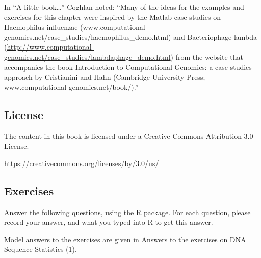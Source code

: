 \documentclass[
]{book}
\begin{document}
In ``A little book\ldots{}'' Coghlan noted: ``Many of the ideas for the examples and exercises for this chapter were inspired by the Matlab case studies on Haemophilus influenzae (www.computational-genomics.net/case\_studies/haemophilus\_demo.html) and Bacteriophage lambda (\url{http://www.computational-genomics.net/case_studies/lambdaphage_demo.html}) from the website that accompanies the book Introduction to Computational Genomics: a case studies approach by Cristianini and Hahn (Cambridge University Press; www.computational-genomics.net/book/).''

\hypertarget{license}{%
\subsection{License}\label{license}}

The content in this book is licensed under a Creative Commons Attribution 3.0 License.

\url{https://creativecommons.org/licenses/by/3.0/us/}

\hypertarget{exercises}{%
\subsection{Exercises}\label{exercises}}

Answer the following questions, using the R package. For each question, please record your answer, and what you typed into R to get this answer.

Model answers to the exercises are given in Answers to the exercises on DNA Sequence Statistics (1).
\end{document}
